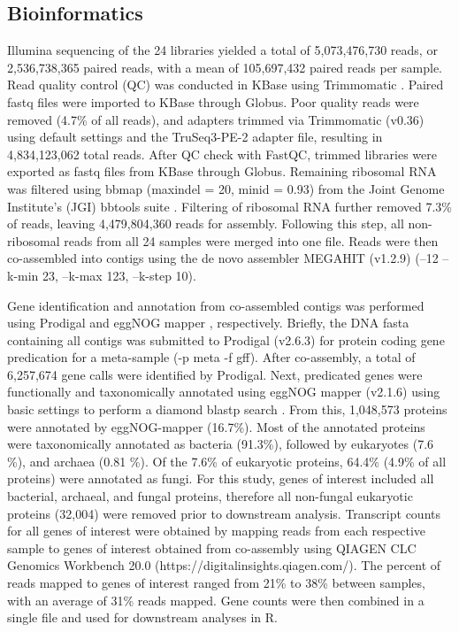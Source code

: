 \documentclass[
  sn-nature,
  lineno, referee]{sn-jnl}
\begin{document}
\subsection{Bioinformatics}\label{bioinformatics}

Illumina sequencing of the 24 libraries yielded a total of 5,073,476,730
reads, or 2,536,738,365 paired reads, with a mean of 105,697,432 paired
reads per sample. Read quality control (QC) was conducted in KBase
\citep{arkin_kbase_2018} using Trimmomatic
\citep{bolger_trimmomatic_2014}. Paired fastq files were imported to
KBase through Globus. Poor quality reads were removed (4.7\% of all
reads), and adapters trimmed via Trimmomatic (v0.36) using default
settings and the TruSeq3-PE-2 adapter file, resulting in 4,834,123,062
total reads. After QC check with FastQC, trimmed libraries were exported
as fastq files from KBase through Globus. Remaining ribosomal RNA was
filtered using bbmap (maxindel = 20, minid = 0.93) from the Joint Genome
Institute's (JGI) bbtools suite \citep{bushnell_bbtools_2014}. Filtering
of ribosomal RNA further removed 7.3\% of reads, leaving 4,479,804,360
reads for assembly. Following this step, all non-ribosomal reads from
all 24 samples were merged into one file. Reads were then co-assembled
into contigs using the de novo assembler MEGAHIT (v1.2.9)
\citep{li_megahit_2015} (--12 --k-min 23, --k-max 123, --k-step 10).

Gene identification and annotation from co-assembled contigs was
performed using Prodigal \citep{hyatt_prodigal_2010} and eggNOG mapper
\citep{cantalapiedra_eggnog-mapper_2021}, respectively. Briefly, the DNA
fasta containing all contigs was submitted to Prodigal (v2.6.3) for
protein coding gene predication for a meta-sample (-p meta -f gff).
After co-assembly, a total of 6,257,674 gene calls were identified by
Prodigal. Next, predicated genes were functionally and taxonomically
annotated using eggNOG mapper (v2.1.6) using basic settings to perform a
diamond blastp search \citep{buchfink_sensitive_2021}. From this,
1,048,573 proteins were annotated by eggNOG-mapper (16.7\%). Most of the
annotated proteins were taxonomically annotated as bacteria (91.3\%),
followed by eukaryotes (7.6 \%), and archaea (0.81 \%). Of the 7.6\% of
eukaryotic proteins, 64.4\% (4.9\% of all proteins) were annotated as
fungi. For this study, genes of interest included all bacterial,
archaeal, and fungal proteins, therefore all non-fungal eukaryotic
proteins (32,004) were removed prior to downstream analysis. Transcript
counts for all genes of interest were obtained by mapping reads from
each respective sample to genes of interest obtained from co-assembly
using QIAGEN CLC Genomics Workbench 20.0
(https://digitalinsights.qiagen.com/). The percent of reads mapped to
genes of interest ranged from 21\% to 38\% between samples, with an
average of 31\% reads mapped. Gene counts were then combined in a single
file and used for downstream analyses in R.
\end{document}

